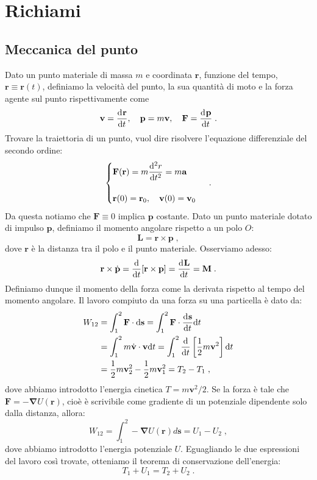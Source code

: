 \section{Richiami}
\subsection*{Meccanica del punto}
Dato un punto materiale di massa $m$ e coordinata $\mathbf{r}$, funzione del tempo, $\mathbf{r}\equiv\mathbf{r}(t)$, definiamo la velocità del punto, la sua quantità di moto e la forza agente sul punto rispettivamente come
\begin{equation}
\mathbf{v}=\frac{\mathrm{d}^{}\mathbf{r}}{\mathrm{d}t^{}},\quad \mathbf{p}=m\mathbf{v},\quad \mathbf{F}=\frac{\mathrm{d}^{}\mathbf{p}}{\mathrm{d}t^{}}\;.
\end{equation}
Trovare la traiettoria di un punto, vuol dire risolvere l'equazione differenziale del secondo ordine:
\begin{equation}
\begin{cases}
\mathbf{F}(\mathbf{r})=m\dfrac{\mathrm{d}^2{r}}{\mathrm{d}{t}^2}=m\mathbf{a} \\
\\
\mathbf{r}(0)=\mathbf{r}_0,\quad \mathbf{v}(0)=\mathbf{v}_0
\end{cases}\;.
\end{equation}
Da questa notiamo che $\mathbf{F}\equiv 0$ implica $\mathbf{p}$ costante. Dato un punto materiale dotato di impulso $\mathbf{p}$, definiamo il momento angolare rispetto a un polo $O$:
\begin{equation}
\mathbf{L}=\mathbf{r}\times \mathbf{p}\;,
\end{equation}
dove $\mathbf{r}$ è la distanza tra il polo e il punto materiale. Osserviamo adesso:
\begin{equation}
\mathbf{r}\times \dot{\mathbf{p}}=\frac{\mathrm{d}}{\mathrm{d}t}[\mathbf{r}\times\mathbf{p}]=\frac{\mathrm{d}^{}\mathbf{L}}{\mathrm{d}t^{}}=\mathbf{M}\;.
\end{equation}
Definiamo dunque il momento della forza come la derivata rispetto al tempo del momento angolare. Il lavoro compiuto da una forza su una particella è dato da:
\begin{align}
W_{12}&=\int_1^2 \mathbf{F}\cdot \mathrm{d}{\mathbf{s}}=\int_1^2 \mathbf{F}\cdot \frac{\mathrm{d}^{}\mathbf{s}}{\mathrm{d}t^{}}\mathrm{d}t \notag \\
&= \int_1^2 m\dot{\mathbf{v}}\cdot\mathbf{v}\mathrm{d}t=\int_1^2 \frac{\mathrm{d}}{\mathrm{d}t}\left[\frac{1}{2}m\mathbf{v}^2\right]\mathrm{d}t
\notag \\
&= \frac{1}{2}m\mathbf{v}_2^2-\frac{1}{2}m\mathbf{v}_1^2=T_2-T_1\;,
\end{align}
dove abbiamo introdotto l'energia cinetica $T=m\mathbf{v}^2/2$. Se la forza è tale che $\mathbf{F}=-\mathbf{\nabla}U(\mathbf{r})$, cioè è scrivibile come gradiente di un potenziale dipendente solo dalla distanza, allora:
\begin{equation}
W_{12}=\int_1^2 -\mathbf{\nabla}U(\mathbf{r})d\mathbf{s}=U_1-U_2\;,
\end{equation}
dove abbiamo introdotto l'energia potenziale $U$. Eguagliando le due espressioni del lavoro così trovate, otteniamo il teorema di conservazione dell'energia:
\begin{equation}
T_1+U_1=T_2+U_2\;.
\end{equation}
